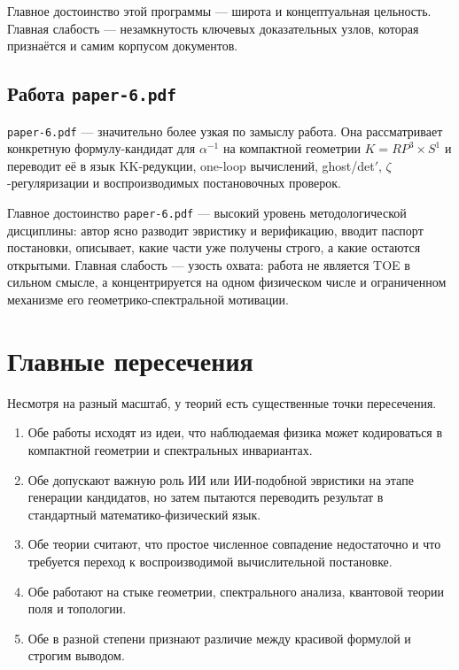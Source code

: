 \documentclass[12pt,a4paper]{article}
\begin{document}
Главное достоинство этой программы --- широта и концептуальная цельность. Главная слабость --- незамкнутость ключевых доказательных узлов, которая признаётся и самим корпусом документов.

\subsection{Работа \texttt{paper-6.pdf}}

\texttt{paper-6.pdf} --- значительно более узкая по замыслу работа. Она рассматривает конкретную формулу-кандидат для \(\alpha^{-1}\) на компактной геометрии \(K = RP^3 \times S^1\) и переводит её в язык KK-редукции, one-loop вычислений, ghost/det$'$, \(\zeta\)-регуляризации и воспроизводимых постановочных проверок.

Главное достоинство \texttt{paper-6.pdf} --- высокий уровень методологической дисциплины: автор ясно разводит эвристику и верификацию, вводит паспорт постановки, описывает, какие части уже получены строго, а какие остаются открытыми. Главная слабость --- узость охвата: работа не является TOE в сильном смысле, а концентрируется на одном физическом числе и ограниченном механизме его геометрико-спектральной мотивации.

\section{Главные пересечения}

Несмотря на разный масштаб, у теорий есть существенные точки пересечения.

\begin{enumerate}
    \item Обе работы исходят из идеи, что наблюдаемая физика может кодироваться в компактной геометрии и спектральных инвариантах.
    \item Обе допускают важную роль ИИ или ИИ-подобной эвристики на этапе генерации кандидатов, но затем пытаются переводить результат в стандартный математико-физический язык.
    \item Обе теории считают, что простое численное совпадение недостаточно и что требуется переход к воспроизводимой вычислительной постановке.
    \item Обе работают на стыке геометрии, спектрального анализа, квантовой теории поля и топологии.
    \item Обе в разной степени признают различие между красивой формулой и строгим выводом.
\end{enumerate}
\end{document}
